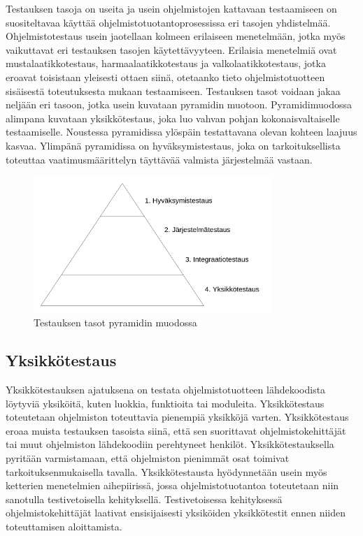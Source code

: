 Testauksen tasoja on useita ja usein ohjelmistojen kattavaan testaamiseen on suositeltavaa käyttää ohjelmistotuotantoprosessissa eri tasojen yhdistelmää.
Ohjelmistotestaus usein jaotellaan kolmeen erilaiseen menetelmään, jotka myös vaikuttavat eri testauksen tasojen käytettävyyteen.
Erilaisia menetelmiä ovat mustalaatikkotestaus, harmaalaatikkotestaus ja valkolaatikkotestaus, jotka eroavat toisistaan yleisesti ottaen siinä, otetaanko tieto ohjelmistotuotteen sisäisestä toteutuksesta mukaan testaamiseen.
Testauksen tasot voidaan jakaa neljään eri tasoon, jotka usein kuvataan pyramidin muotoon.
Pyramidimuodossa alimpana kuvataan yksikkötestaus, joka luo vahvan pohjan kokonaisvaltaiselle testaamiselle.
Noustessa pyramidissa ylöspäin testattavana olevan kohteen laajuus kasvaa.
Ylimpänä pyramidissa on hyväksymistestaus, joka on tarkoituksellista toteuttaa vaatimusmäärittelyn täyttävää valmista järjestelmää vastaan.
\begin{figure}[H]
  \centering
  \includegraphics[width=0.8\textwidth]{assets/testing-levels-pyramid.png}
  \caption{Testauksen tasot pyramidin muodossa}
  \label{fig:testing-levels-pyramid}
\end{figure}

  \subsection{Yksikkötestaus}

  Yksikkötestauksen ajatuksena on testata ohjelmistotuotteen lähdekoodista löytyviä yksiköitä, kuten luokkia, funktioita tai moduleita.
  Yksikkötestaus toteutetaan ohjelmiston toteuttavia pienempiä yksikköjä varten.
  Yksikkötestaus eroaa muista testauksen tasoista siinä, että sen suorittavat ohjelmistokehittäjät tai muut ohjelmiston lähdekoodiin perehtyneet henkilöt.
  Yksikkötestauksella pyritään varmistamaan, että ohjelmiston pienimmät osat toimivat tarkoituksenmukaisella tavalla.
  Yksikkötestausta hyödynnetään usein myös ketterien menetelmien aihepiirissä, jossa ohjelmistotuotantoa toteutetaan niin sanotulla testivetoisella kehityksellä.
  Testivetoisessa kehityksessä ohjelmistokehittäjät laativat ensisijaisesti yksiköiden yksikkötestit ennen niiden toteuttamisen aloittamista.

